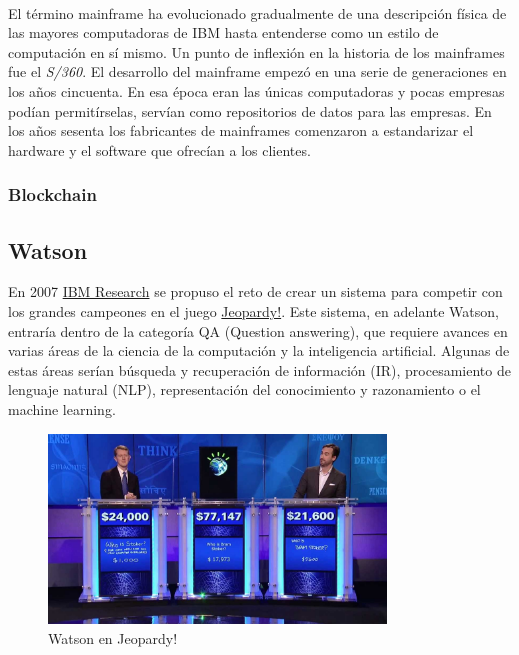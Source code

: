 \documentclass[paper=a4, fontsize=10pt]{scrartcl} %
\numberwithin{equation}{section} %
\numberwithin{figure}{section} %
\numberwithin{table}{section} %
\begin{document}
\

El término mainframe ha evolucionado gradualmente de una descripción física de las mayores computadoras de IBM hasta entenderse como un estilo de computación en sí mismo.
Un punto de inflexión en la historia de los mainframes fue el \textit{S/360}.
El desarrollo del mainframe empezó en una serie de generaciones en los años cincuenta.
En esa época eran las únicas computadoras y pocas empresas podían permitírselas, servían como repositorios de datos para las empresas.
En los años sesenta los fabricantes de mainframes comenzaron a estandarizar el hardware y el software que ofrecían a los clientes.



\subsubsection{Blockchain}
\subsection{Watson}
En 2007 \href{https://www.research.ibm.com/}{IBM Research} se propuso el reto de crear un sistema para competir con los grandes campeones en el juego \href{https://www.jeopardy.com/}{Jeopardy!}. 
Este sistema, en adelante Watson, entraría dentro de la categoría QA (Question answering), que requiere avances en varias áreas de la ciencia de la computación y la inteligencia artificial. 
Algunas de estas áreas serían búsqueda y recuperación de información (IR), procesamiento de lenguaje natural (NLP), representación del conocimiento y razonamiento o el machine learning.

\begin{figure}[H]
	\centering
	\label{j-watson}
	\includegraphics[width=0.8\textwidth]{./Imagenes/j-watson.jpg}
	\caption{Watson en Jeopardy!}
\end{figure}
\end{document}
